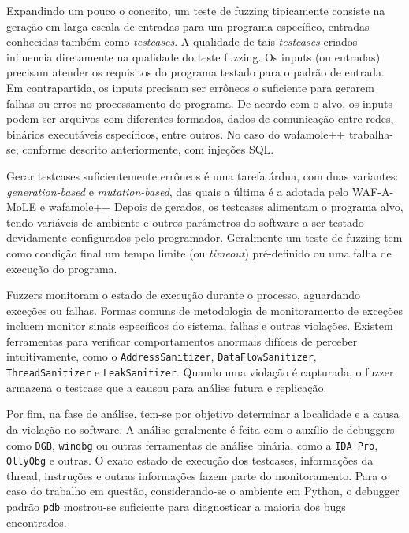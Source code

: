 Expandindo um pouco o conceito, um teste de fuzzing tipicamente consiste na geração em larga escala de entradas para um programa específico, entradas conhecidas também como \textit{testcases}. A qualidade de tais \textit{testcases} criados influencia diretamente na qualidade do teste fuzzing. Os inputs (ou entradas) precisam atender os requisitos do programa testado para o padrão de entrada. Em contrapartida, os inputs precisam ser errôneos o suficiente para gerarem falhas ou erros no processamento do programa. De acordo com o alvo, os inputs podem ser arquivos com diferentes formados, dados de comunicação entre redes, binários executáveis específicos, entre outros. No caso do wafamole++ trabalha-se, conforme descrito anteriormente, com injeções SQL.

Gerar testcases suficientemente errôneos é uma tarefa árdua, com duas variantes: \textit{generation-based} e \textit{mutation-based}, das quais a última é a adotada pelo WAF-A-MoLE e wafamole++
Depois de gerados, os testcases alimentam o programa alvo, tendo variáveis de ambiente e outros parâmetros do software a ser testado devidamente configurados pelo programador. Geralmente um teste de fuzzing tem como condição final um tempo limite (ou \textit{timeout}) pré-definido ou uma falha de execução do programa.

Fuzzers monitoram o estado de execução durante o processo, aguardando exceções ou falhas.  Formas comuns de metodologia de monitoramento de exceções incluem monitor sinais específicos do sistema, falhas e outras violações. Existem ferramentas para verificar comportamentos anormais difíceis de perceber intuitivamente, como o \verb+AddressSanitizer+, \verb+DataFlowSanitizer+, \verb+ThreadSanitizer+ e \verb+LeakSanitizer+. Quando uma violação é capturada, o fuzzer armazena o testcase que a causou para análise futura e replicação.

Por fim, na fase de análise, tem-se por objetivo determinar a localidade e a causa da violação no software. A análise geralmente é feita com o auxílio de debuggers como \verb+DGB+, \verb+windbg+ ou outras ferramentas de análise binária, como a \verb+IDA Pro+, \verb+OllyObg+ e outras. O exato estado de execução dos testcases, informações da thread, instruções e outras informações fazem parte do monitoramento. Para o caso do trabalho em questão, considerando-se o ambiente em Python, o debugger padrão \verb+pdb+ mostrou-se suficiente para diagnosticar a maioria dos bugs encontrados.

